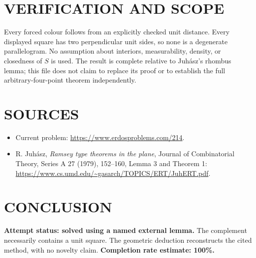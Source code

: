\section{VERIFICATION AND SCOPE}
Every forced colour follows from an explicitly checked unit distance. Every displayed square has two perpendicular unit sides, so none is a degenerate parallelogram. No assumption about interiors, measurability, density, or closedness of $S$ is used. The result is complete relative to Juh\'asz's rhombus lemma; this file does not claim to replace its proof or to establish the full arbitrary-four-point theorem independently.

\section{SOURCES}
\begin{itemize}
\item Current problem: \url{https://www.erdosproblems.com/214}.
\item R. Juh\'asz, \emph{Ramsey type theorems in the plane}, Journal of Combinatorial Theory, Series A 27 (1979), 152--160, Lemma 3 and Theorem 1: \url{https://www.cs.umd.edu/~gasarch/TOPICS/ERT/JuhERT.pdf}.
\end{itemize}
\section{CONCLUSION}
\textbf{Attempt status: solved using a named external lemma.} The complement necessarily contains a unit square. The geometric deduction reconstructs the cited method, with no novelty claim.
\textbf{Completion rate estimate: 100\%.}
